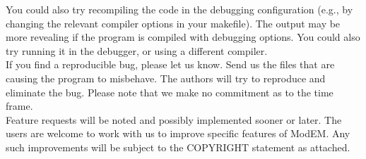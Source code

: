 \documentclass[12pt]{article}
\begin{document}
You could also try recompiling the code in the debugging configuration (e.g., by changing the relevant compiler options in your makefile). The output may be more revealing if the program is compiled with debugging options. You could also try running it in the debugger, or using a different compiler.\\

If you find a reproducible bug, please let us know. Send us the files that are causing the program to misbehave. The authors will try to reproduce and eliminate the bug. Please note that we make no commitment as to the time frame.\\

Feature requests will be noted and possibly implemented sooner or later.
The users are welcome to work with us to improve specific features of ModEM.
Any such improvements will be subject to the COPYRIGHT statement as attached.
\end{document}
